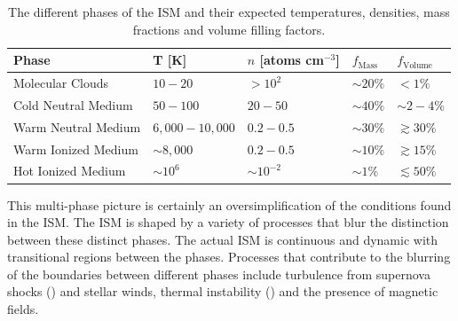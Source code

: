 \begin{table}
	\centering
	\begin{tabular}{p{4cm}|p{3cm}|p{3cm}|p{1.5cm}|p{1.5cm}}
		\hline
		\hline
		Phase & T [K] & $n$ [atoms cm$^{-3}$] & $f_{\textrm{Mass}}$ & $f_{\textrm{Volume}}$ \\
		\hline
		\hline
		Molecular Clouds & $10 - 20$ & $>10^2$ & $\sim 20\%$ & $<1\%$ \\
		Cold Neutral Medium & $50 - 100$ & $20 - 50$ & $\sim 40\%$ & $\sim2 - 4 \%$\\
		Warm Neutral Medium & $6,000 - 10,000$ & $0.2 - 0.5$ & $\sim 30\%$ & $\gtrsim 30\%$ \\
		Warm Ionized Medium & $\sim8,000$ & $0.2 - 0.5$ & $\sim 10\%$ & $\gtrsim 15\%$ \\
		Hot Ionized Medium & $\sim10^6$ & $\sim10^{-2}$ & $\sim 1\%$ & $\lesssim 50\%$ \\
		\hline
	\end{tabular}
	\caption{The different phases of the ISM and their expected temperatures, densities, mass fractions and volume filling factors.}
	\label{tab:ISM_phases}
\end{table}

This multi-phase picture is certainly an oversimplification of the conditions found in the ISM. The ISM is shaped by a variety of processes that blur the distinction between these distinct phases. The actual ISM is continuous and dynamic with transitional regions between the phases. Processes that contribute to the blurring of the boundaries between different phases include turbulence from supernova shocks (\citealt{MacLow_2004}) and stellar winds, thermal instability (\citealt{Kritsuk_2002}) and the presence of magnetic fields.

